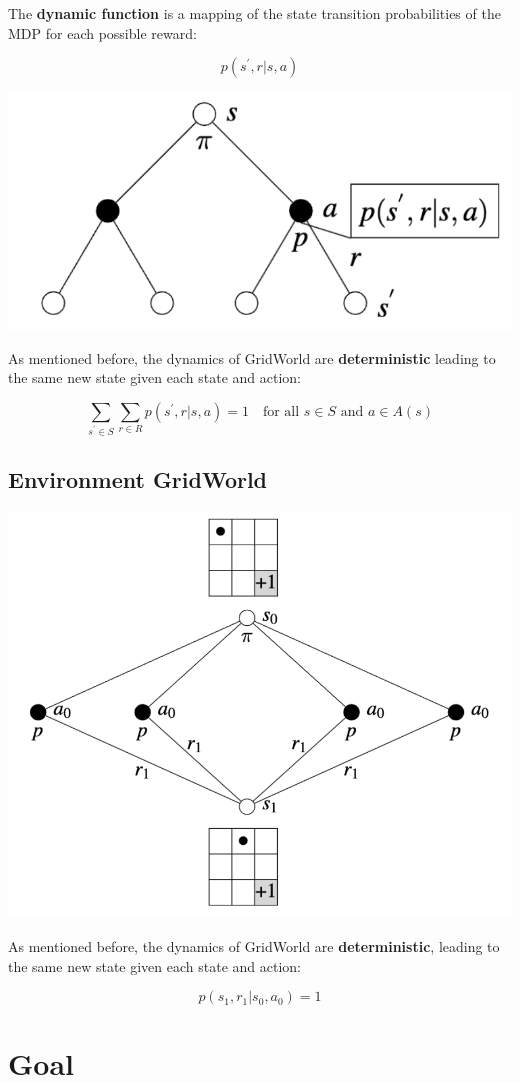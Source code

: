 \documentclass[
  letterpaper,
  DIV=11,
  numbers=noendperiod]{scrreprt}
\begin{document}
The \textbf{dynamic function} is a mapping of the state transition
probabilities of the MDP for each possible reward:

\[
p(s^{'}, r | s, a)
\]

\begin{center}
\includegraphics[width=0.35\linewidth,height=\textheight,keepaspectratio]{lecture4/images/DynamicFunction.png}
\end{center}

As mentioned before, the dynamics of GridWorld are
\textbf{deterministic} leading to the same new state given each state
and action:

\[
\sum_{s^{'} \in S}\sum_{r \in R} p(s^{'}, r| s, a) = 1 \quad \text{for all } s \in S \text{ and } a \in A(s)
\]

\subsection{Environment GridWorld}\label{environment-gridworld-3}

\begin{center}
\includegraphics[width=0.55\linewidth,height=\textheight,keepaspectratio]{lecture4/images/GridWorldDynamicFunction.png}
\end{center}

As mentioned before, the dynamics of GridWorld are
\textbf{deterministic}, leading to the same new state given each state
and action:

\[
p(s_{1}, r_{1}| s_0, a_{0}) = 1
\]

\section{Goal}\label{goal}
\end{document}
